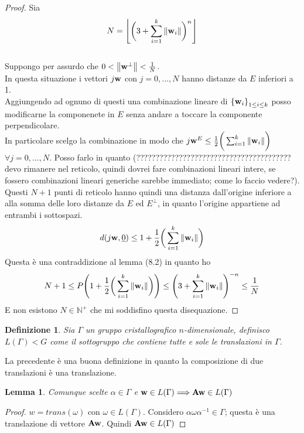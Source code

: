 \documentclass[12pt,a4paper]{book}
\newtheorem{definition}{Definizione}[section]
\newtheorem{lemma}[theorem]{Lemma}
\begin{document}
\begin{proof}
Sia \hfill \[ N = \left\lfloor
\bigg( 3 +  \sum_{i = 1}^{k} \norm{\vb{w}_i} \bigg)^{n}
\right\rfloor\] \\
Suppongo per assurdo che $0 < \norm{\vb{w}^{\perp}}  < \frac{1}{N}$. \\
In questa situazione i vettori $j \vb{w}$ con $j = 0, ..., N$ hanno distanze da $E$ inferiori a 1. \\
Aggiungendo ad ognuno di questi una combinazione lineare di ${\{\vb{w}_i\}}_{1 \leq i \leq k }$ posso modificarne la componenete in $E$ senza andare a toccare la componente perpendicolare. \\
In particolare scelgo la combinazione in modo che $j \vb{w}^{E} \leq \frac{1}{2} \bigg( \sum_{i = 1}^{k} \norm{\vb{w}_i} \bigg)$     $\forall j = 0, ..., N$. 
Posso farlo in quanto (???????????????????????????????????????? devo rimanere nel reticolo, quindi dovrei fare combinazioni lineari intere, se fossero combinazioni lineari generiche sarebbe immediato; come lo faccio vedere?). \\
Questi $N+1$ punti di reticolo hanno quindi una distanza dall'origine inferiore a alla somma delle loro distanze da $E$ ed $E^{\perp}$, in quanto l'origine appartiene ad entrambi i sottospazi.
\[ d(j\vb{w}, \underline{0} ) \leq 1 + \frac{1}{2} \bigg( \sum_{i = 1}^{k} \norm{\vb{w}_i} \bigg) \]
Questa è una contraddizione al lemma (8.2) in quanto ho 
\[ N+1 \leq P \Bigg( 1 + \frac{1}{2} \bigg( \sum_{i = 1}^{k} \norm{\vb{w}_i} \bigg) \Bigg)  \leq \Bigg( 3 +  \sum_{i = 1}^{k} \norm{\vb{w}_i} \Bigg)^{-n} \leq  \frac{1}{N} \]
E non esistono $N \in \mathbb{N}^{+}$ che mi soddisfino questa disequazione.
\end{proof}


\begin{definition}
Sia $\Gamma$ un gruppo cristallografico $n$-dimensionale, definisco $L(\Gamma)<G$ come il sottogruppo che contiene tutte e sole le translazioni in $\Gamma$.
\end{definition}

La precedente è una buona definizione in quanto la composizione di due translazioni è una translazione. 

\begin{lemma}
Comunque scelte $\alpha \in \Gamma$ e $\vb{w} \in L(\Gamma) \Longrightarrow \vb{Aw} \in L(\Gamma)$ 
\end{lemma}

\begin{proof}
$w = trans(\omega)$ con $\omega \in L(\Gamma)$.
Considero $\alpha \omega \alpha^{-1} \in \Gamma$; questa è una translazione di vettore $\vb{Aw}$. Quindi $\vb{Aw} \in L(\Gamma)$
\end{proof}
\end{document}
